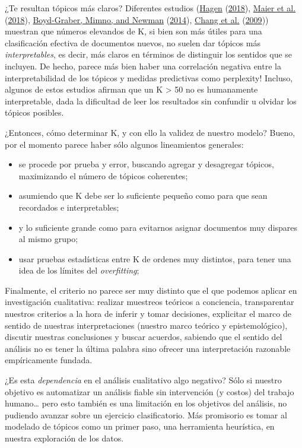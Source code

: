 \documentclass[
]{book}
\providecommand{\tightlist}{%
  \setlength{\itemsep}{0pt}\setlength{\parskip}{0pt}}
\begin{document}
¿Te resultan tópicos más claros? Diferentes estudios (\protect\hyperlink{ref-Hagen2018}{Hagen} (\protect\hyperlink{ref-Hagen2018}{2018}), \protect\hyperlink{ref-Maier2018}{Maier et al.} (\protect\hyperlink{ref-Maier2018}{2018}), \protect\hyperlink{ref-Boyd-Graber2014}{Boyd-Graber, Mimno, and Newman} (\protect\hyperlink{ref-Boyd-Graber2014}{2014}), \protect\hyperlink{ref-Chang2009}{Chang et al.} (\protect\hyperlink{ref-Chang2009}{2009})) muestran que números elevandos de K, si bien son más útiles para una clasificación efectiva de documentos nuevos, no suelen dar tópicos más \emph{interpretables}, es decir, más claros en términos de distinguir los sentidos que se incluyen. De hecho, parece más bien haber una correlación negativa entre la interpretabilidad de los tópicos y medidas predictivas como perplexity! Incluso, algunos de estos estudios afirman que un K \textgreater{} 50 no es humanamente interpretable, dada la dificultad de leer los resultados sin confundir u olvidar los tópicos posibles.

¿Entonces, cómo determinar K, y con ello la validez de nuestro modelo? Bueno, por el momento parece haber sólo algunos lineamientos generales:

\begin{itemize}
\tightlist
\item
  se procede por prueba y error, buscando agregar y desagregar tópicos, maximizando el número de tópicos coherentes;
\item
  asumiendo que K debe ser lo suficiente pequeño como para que sean recordados e interpretables;
\item
  y lo suficiente grande como para evitarnos asignar documentos muy dispares al mismo grupo;
\item
  usar pruebas estadísticas entre K de ordenes muy distintos, para tener una idea de los límites del \emph{overfitting};
\end{itemize}

Finalmente, el criterio no parece ser muy distinto que el que podemos aplicar en investigación cualitativa: realizar muestreos teóricos a conciencia, transparentar nuestros criterios a la hora de inferir y tomar decisiones, explicitar el marco de sentido de nuestras interpretaciones (nuestro marco teórico y epistemológico), discutir nuestras conclusiones y buscar acuerdos, sabiendo que el sentido del análisis no es tener la última palabra sino ofrecer una interpretación razonable empíricamente fundada.

¿Es esta \emph{dependencia} en el análisis cualitativo algo negativo? Sólo si nuestro objetivo es automatizar un análisis fiable sin intervención (y costos) del trabajo humano\ldots{} pero esto también es una limitación en los objetivos del análisis, no pudiendo avanzar sobre un ejercicio clasificatorio. Más promisorio es tomar al modelado de tópicos como un primer paso, una herramienta heurística, en nuestra exploración de los datos.
\end{document}
